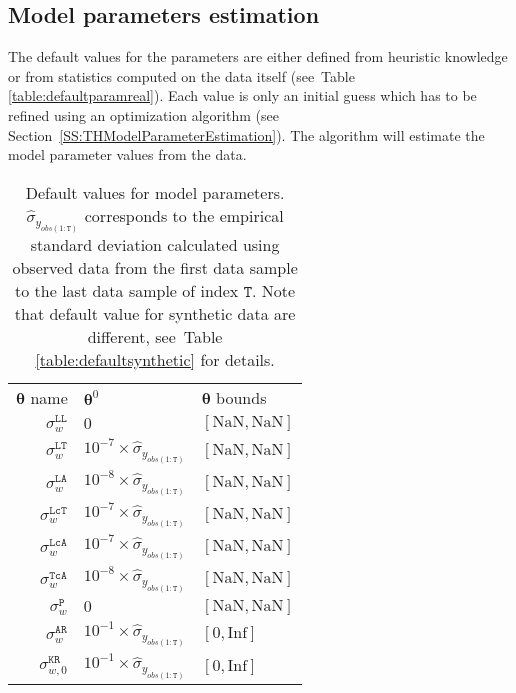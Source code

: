\subsection{Model parameters estimation}
\label{S:PARAMESTIMATION}

The default values for the parameters are either defined from heuristic knowledge or from statistics computed on the data itself (see~Table \ref{table:defaultparamreal}).
Each value is only an initial guess which has to be refined using an optimization algorithm (see Section~\ref{SS:THModelParameterEstimation}). 
The algorithm will estimate the model parameter values from the data.

\begin{table}[h!]
\caption{Default values for model parameters. $\hat{\sigma}_{y_{obs(1:\mathtt{T})}}$ corresponds to the empirical standard deviation calculated using observed data from the first data sample to the last data sample of index $\mathtt{T}$. Note that default value for synthetic data are different, see~Table \ref{table:defaultsynthetic} for details.} 
\centering
\begin{tabular}{r|ll}
\toprule
$\bm{\theta}$ name  & $\bm{\theta}^{0}$ & $\bm{\theta}$ bounds \\\cmidrule(lr){1-3}
$\sigma_{w}^{\mathtt{LL}}$  &  $0$ & $[\text{NaN},\text{NaN}]$ \\
$\sigma_{w}^{\mathtt{LT}} $ &  $10^{-7}\times\hat{\sigma}_{y_{obs(1:\mathtt{T})}}$ & $[\text{NaN},\text{NaN}]$ \\
$\sigma_{w}^{\mathtt{LA}} $ &  $10^{-8}\times\hat{\sigma}_{y_{obs(1:\mathtt{T})}}$ & $[\text{NaN},\text{NaN}]$ \\
$\sigma_{w}^{\mathtt{LcT}} $ &  $10^{-7}\times\hat{\sigma}_{y_{obs(1:\mathtt{T})}}$ & $[\text{NaN},\text{NaN}]$ \\
$\sigma_{w}^{\mathtt{LcA}} $ &  $10^{-7}\times\hat{\sigma}_{y_{obs(1:\mathtt{T})}}$ & $[\text{NaN},\text{NaN}]$ \\
$\sigma_{w}^{\mathtt{TcA}} $ &  $10^{-8}\times\hat{\sigma}_{y_{obs(1:\mathtt{T})}}$ & $[\text{NaN},\text{NaN}]$ \\
$\sigma_{w}^{\mathtt{P}} $ &  $0$ & $[\text{NaN},\text{NaN}]$ \\
$\sigma_{w}^{\mathtt{AR}} $ &  $10^{-1}\times\hat{\sigma}_{y_{obs(1:\mathtt{T})}}$ & $[0,\text{Inf}]$ \\
$\sigma_{w,0}^{\mathtt{KR}}  $ &  $10^{-1}\times\hat{\sigma}_{y_{obs(1:\mathtt{T})}}$  & $[0,\text{Inf}]$ \\

\end{tabular}
\end{table}
